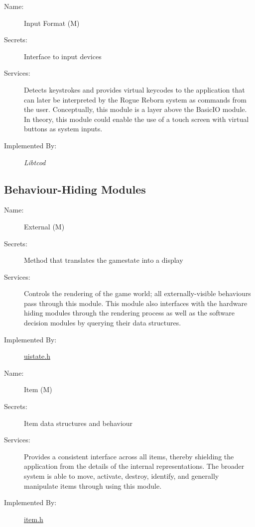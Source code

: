 \documentclass[12pt, titlepage]{article}
\newcounter{mnum}
\newcommand{\mdprint}[1]{\addtocounter{mnum}{1} #1 (M\themnum)}
\begin{document}
        \bigskip\begin{description}
            \item[Name:]\mdprint{Input Format}
            \item[Secrets:]Interface to input devices
            \item[Services:]Detects keystrokes and provides virtual keycodes to the application that can later be interpreted by the Rogue Reborn system as commands from the user. Conceptually, this module is a layer above the BasicIO module.  In theory, this module could enable the use of a touch screen with virtual buttons as system inputs.
            \item[Implemented By:]\it Libtcod
        \end{description}

    \subsection{Behaviour-Hiding Modules}

        \bigskip\begin{description}
            \item[Name:]\mdprint{External}
            \item[Secrets:]Method that translates the gamestate into a display
            \item[Services:]Controls the rendering of the game world; all externally-visible behaviours pass through this module.  This module also interfaces with the hardware hiding modules through the rendering process as well as the software decision modules by querying their data structures.
            \item[Implemented By:]\href{run:../../../src/include/uistate.h}{uistate.h}
        \end{description}

        \bigskip\begin{description}
            \item[Name:]\mdprint{Item}
            \item[Secrets:]Item data structures and behaviour
            \item[Services:]Provides a consistent interface across all items, thereby shielding the application from the details of the internal representations.  The broader system is able to move, activate, destroy, identify, and generally manipulate items through using this module.
            \item[Implemented By:]\href{run:../../../src/include/item.h}{item.h}
        \end{description}
\end{document}
